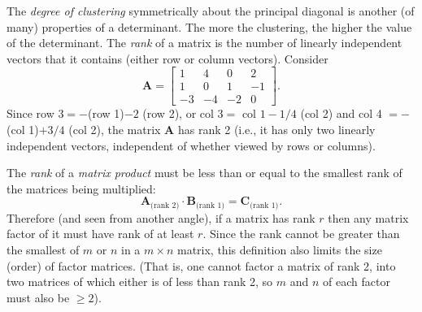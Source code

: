 The \emph{degree of clustering} symmetrically about the principal diagonal is another (of many) 
properties of a determinant. The more the clustering, the higher the value of the determinant.
The \emph{rank} of a matrix is the number of linearly 
independent vectors that it contains (either row or column vectors).  Consider
\begin{equation}
\mathbf{A} = \left [ \begin{array}{cccc}
1 & 4 & 0 & 2 \\1 & 0 & 1 & -1\\
-3 & -4 & -2 & 0
\end{array} \right] .
\end{equation}
Since row $3 = -$(row 1)$ - 2$ (row 2), or col $3 = $ col $1 - 1/4$ (col 2) and col 4 $= -$(col 1)$ + 3/4$ (col 2), 
the matrix $\mathbf{A}$ has rank 2 (i.e., it has only two linearly independent vectors, independent of whether 
viewed by rows or columns).

The \emph{rank} of a \emph{matrix product} must be less than or equal to the 
smallest rank of the matrices being multiplied:
\begin{equation}
\mathbf{A}_{\mbox{(rank 2)}}\cdot \mathbf{B}_{\mbox{(rank 1)}} = \mathbf{C}_{\mbox{(rank 1)}}.
\end{equation}	 
Therefore (and seen from another angle), if a matrix has rank $r$ then any matrix factor of it must have 
rank of at least $r$. Since the rank cannot be greater than the smallest of $m$ or $n$ in a $m \times n$ matrix, 
this definition also limits the size (order) of factor matrices. (That is, one cannot factor a matrix 
of rank 2, into two matrices of which either is of less than rank 2, so $m$ and $n$ of each factor must 
also be $\geq 2$).


